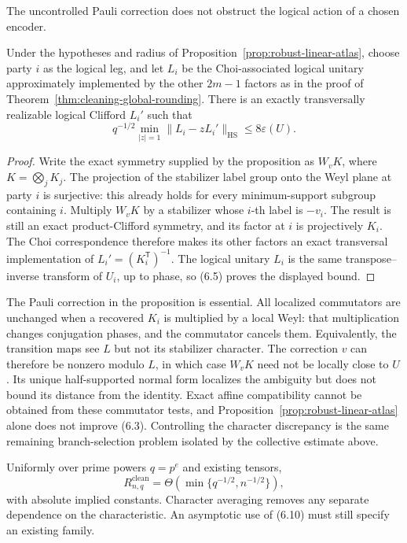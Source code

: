The uncontrolled Pauli correction does not obstruct the logical action of a
chosen encoder.

\begin{corollary}
\label{cor:logical-clifford-rounding}
Under the hypotheses and radius of
Proposition~\ref{prop:robust-linear-atlas}, choose party \(i\) as the logical
leg, and let \(L_i\) be the Choi-associated logical unitary approximately
implemented by the other \(2m-1\) factors as in the proof of Theorem~\ref{thm:cleaning-global-rounding}.  There
is an exactly transversally realizable logical Clifford \(L_i'\) such that
\[
 q^{-1/2}\min_{|z|=1}\lVert L_i-zL_i'\rVert_{\mathrm{HS}}
 \leq8\varepsilon(U).
\]
\end{corollary}

\begin{proof}
Write the exact symmetry supplied by the proposition as
\(W_vK\), where \(K=\bigotimes_jK_j\).  The projection of the stabilizer
label group onto the Weyl plane at party \(i\) is surjective: this already
holds for every minimum-support subgroup containing \(i\).  Multiply \(W_vK\)
by a stabilizer whose \(i\)-th label is \(-v_i\).  The result is still an exact
product-Clifford symmetry, and its factor at \(i\) is projectively \(K_i\).
The Choi correspondence therefore makes its other factors an exact
transversal implementation of
\(L_i'=(K_i^{\mathsf T})^{-1}\).  The logical unitary \(L_i\) is the same
transpose--inverse transform of \(U_i\), up to phase, so (6.5) proves the
displayed bound.
\end{proof}

The Pauli correction in the proposition is essential.  All localized
commutators are unchanged when a recovered \(K_i\) is multiplied by a
local Weyl: that multiplication changes conjugation phases, and the
commutator cancels them.  Equivalently, the transition maps see \(L\)
but not its stabilizer character.  The correction \(v\) can therefore be
nonzero modulo \(L\), in which case \(W_vK\) need not be locally close to
\(U\).  Its unique half-supported normal form localizes the ambiguity but
does not bound its distance from the identity.  Exact affine compatibility
cannot be obtained from these commutator tests, and
Proposition~\ref{prop:robust-linear-atlas} alone
does not improve (6.3).  Controlling the character discrepancy is the
same remaining branch-selection problem isolated by the collective
estimate above.

Uniformly over prime powers \(q=p^e\) and existing tensors,
\[
 R^{\mathrm{clean}}_{n,q}
 =\Theta\!\left(\min\{q^{-1/2},n^{-1/2}\}\right),              \tag{6.10}
\]
with absolute implied constants.  Character averaging removes any separate
dependence on the characteristic.  An asymptotic use of (6.10) must still
specify an existing family.

